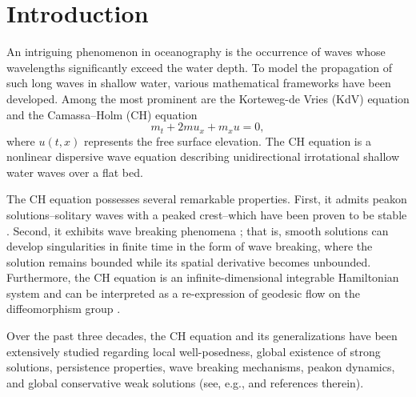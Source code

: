 \documentclass[preprint,12pt]{elsarticle}
\numberwithin{equation}{section}
\begin{document}

\section{Introduction}
An intriguing phenomenon in oceanography is the occurrence of waves whose wavelengths significantly exceed the water depth. To model the propagation of such long waves in shallow water, various mathematical frameworks have been developed. Among the most prominent are the Korteweg-de Vries (KdV) equation and the Camassa--Holm (CH) equation \cite{Camassa1993}
\begin{equation}
    m_t + 2m u_x + m_x u = 0,
\label{101}
\end{equation}
where \( u(t, x) \) represents the free surface elevation. The CH equation is a nonlinear dispersive wave equation describing unidirectional irrotational shallow water waves over a flat bed.

The CH equation possesses several remarkable properties. First, it admits peakon solutions--solitary waves with a peaked crest--which have been proven to be stable \cite{Constantin2000}. Second, it exhibits wave breaking phenomena \cite{Constantin1998}; that is, smooth solutions can develop singularities in finite time in the form of wave breaking, where the solution remains bounded while its spatial derivative becomes unbounded. Furthermore, the CH equation is an infinite-dimensional integrable Hamiltonian system \cite{Fokas1981} and can be interpreted as a re-expression of geodesic flow on the diffeomorphism group \cite{Constantin2000}.

Over the past three decades, the CH equation and its generalizations have been extensively studied regarding local well-posedness, global existence of strong solutions, persistence properties, wave breaking mechanisms, peakon dynamics, and global conservative weak solutions (see, e.g., \cite{Constantin19981,Constantin1998,Constantin2000,Bressan2007,Brandolese2012,Brandolese20141,Brandolese20142,
Constantin20004,Constantin2009,Mustafa20072,Freire1,Zhou2025,Qu2020,Ji2021,Ji2022,Novruzov2022,Coclite20052,Zhou2022,Zhou2024,Zhou2026} and references therein).
\end{document}
